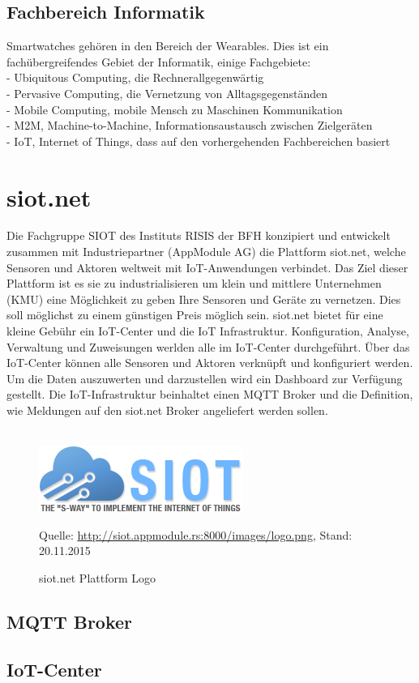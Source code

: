 \subsection{Fachbereich Informatik}
Smartwatches gehören in den Bereich der Wearables. Dies ist ein fachübergreifendes Gebiet der Informatik, einige Fachgebiete:\\
- Ubiquitous Computing, die Rechnerallgegenwärtig \\
- Pervasive Computing, die Vernetzung von Alltagsgegenständen \\
- Mobile Computing, mobile Mensch zu Maschinen Kommunikation \\
- M2M, Machine-to-Machine, Informationsaustausch zwischen Zielgeräten \\
- IoT, Internet of Things, dass auf den vorhergehenden Fachbereichen basiert

\section{siot.net}

Die Fachgruppe SIOT des Instituts RISIS der BFH konzipiert und entwickelt zusammen mit Industriepartner (AppModule AG) die Plattform siot.net, welche Sensoren und Aktoren weltweit mit IoT-Anwendungen verbindet.
Das Ziel dieser Plattform ist es sie zu industrialisieren um klein und mittlere Unternehmen (KMU) eine Möglichkeit zu geben Ihre Sensoren und Geräte zu vernetzen. Dies soll möglichst zu einem günstigen Preis möglich sein.
siot.net bietet für eine kleine Gebühr ein IoT-Center und die IoT Infrastruktur.
Konfiguration, Analyse, Verwaltung und Zuweisungen werlden alle im IoT-Center durchgeführt. Über das IoT-Center können alle Sensoren und Aktoren verknüpft und konfiguriert werden. Um die Daten auszuwerten und darzustellen wird ein Dashboard zur Verfügung gestellt. Die IoT-Infrastruktur beinhaltet einen MQTT Broker und die Definition, wie Meldungen auf den siot.net Broker angeliefert werden sollen.\\\\
\begin{figure}[h]
  \centering
  \includegraphics[scale=1.0]{98_Bilder/02_Grundlagen/siotnetLogo}
  \caption[siot.net Logo]{siot.net Plattform Logo}
  \footnotesize Quelle: \url{http://siot.appmodule.rs:8000/images/logo.png}, Stand: 20.11.2015
\end{figure}
\subsection{MQTT Broker}
\subsection{IoT-Center}
